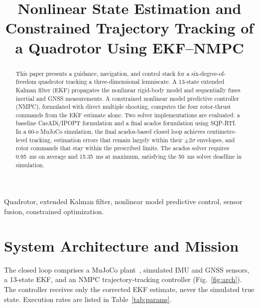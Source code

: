 \documentclass[conference]{IEEEtran}
\begin{document}
\title{Nonlinear State Estimation and Constrained Trajectory Tracking of a Quadrotor Using EKF--NMPC}

\author{
}

\maketitle

\begin{abstract}
This paper presents a guidance, navigation, and control stack for a six-degree-of-freedom quadrotor tracking a three-dimensional lemniscate. A 13-state extended Kalman filter (EKF) propagates the nonlinear rigid-body model and sequentially fuses inertial and GNSS measurements. A constrained nonlinear model predictive controller (NMPC), formulated with direct multiple shooting, computes the four rotor-thrust commands from the EKF estimate alone. Two solver implementations are evaluated: a baseline CasADi/IPOPT formulation and a final acados formulation using SQP-RTI. In a 60-s MuJoCo simulation, the final acados-based closed loop achieves centimetre-level tracking, estimation errors that remain largely within their $\pm2\sigma$ envelopes, and rotor commands that stay within the prescribed limits. The acados solver requires \SI{0.95}{ms} on average and \SI{15.35}{ms} at maximum, satisfying the \SI{50}{ms} solver deadline in simulation.
\end{abstract}

\begin{IEEEkeywords}
Quadrotor, extended Kalman filter, nonlinear model predictive control, sensor fusion, constrained optimization.
\end{IEEEkeywords}

\section{System Architecture and Mission}
The closed loop comprises a MuJoCo plant~\cite{todorov2012mujoco}, simulated IMU and GNSS sensors, a 13-state EKF, and an NMPC trajectory-tracking controller (Fig.~\ref{fig:arch}). The controller receives only the corrected EKF estimate, never the simulated true state. Execution rates are listed in Table~\ref{tab:params}.
\end{document}
